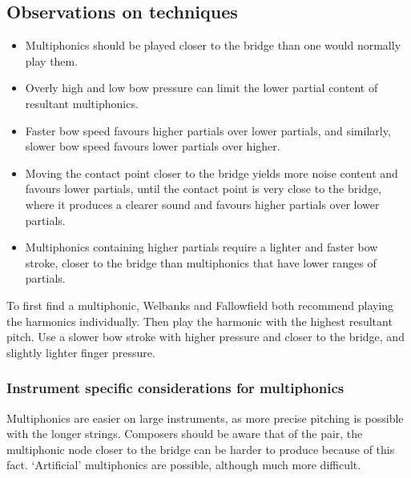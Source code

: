 \subsection{Observations on techniques}
\begin{itemize}
  \item Multiphonics should be played closer to the bridge than one would normally play them.\autocite[]{fallowfieldCelloMap}
  \item Overly high and low bow pressure can limit the lower partial content of resultant multiphonics.
  \item Faster bow speed favours higher partials over lower partials, and similarly, slower bow speed favours lower partials over higher.
  \item Moving the contact point closer to the bridge yields more noise content and favours lower partials, until the contact point is very close to the bridge, where it produces a clearer sound and favours higher partials over lower partials.\autocite[http://www.cellomap.com/index/the-string/multiphonics-and-other-multiple-sounds.html]{fallowfieldCelloMap}
  \item Multiphonics containing higher partials require a lighter and faster bow stroke, closer to the bridge than multiphonics that have lower ranges of partials.\autocite[165]{welbanksFoundationsModernCello}
\end{itemize}


To first find a multiphonic, Welbanks and Fallowfield both recommend playing the harmonics individually.\autocite[167]{welbanksFoundationsModernCello}
Then play the harmonic with the highest resultant pitch. 
Use a slower bow stroke with higher pressure and closer to the bridge, and slightly lighter finger pressure.


\subsubsection{Instrument specific considerations for multiphonics}
Multiphonics are easier on large instruments, as more precise pitching is possible with the longer strings.
Composers should be aware that of the pair, the multiphonic node closer to the bridge can be harder to produce because of this fact.
`Artificial' multiphonics are possible, although much more difficult.\autocite[772]{guettlerBowedstringMultiphonicsAnalyzed2012}


  
